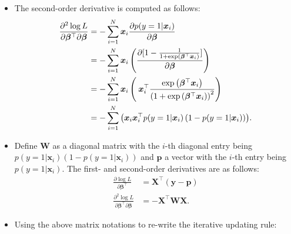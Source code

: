 {\begin{itemize}
                    \begin{equation}
                        \bm{\beta}^t = \bm{\beta}^{t-1} - \eta \left[ \frac{\partial^2 \log L}{\partial \bm{\beta}^\top \partial \bm{\beta}} \right]^{-1} \frac{\partial \log L}{\partial \bm{\beta}^\top}.
                    \end{equation}
                \item The second-order derivative is computed as follows:
                    \begin{equation}
                        \begin{aligned}
                            \frac{\partial^2 \log L}{\partial \bm{\beta}^\top \partial \bm{\beta}} & = -\sum_{i=1}^{N}{\bm{x}_i \frac{\partial p(y=1 | \bm{x}_i)}{\partial \bm{\beta}}   }  \\
                            & = - \sum_{i=1}^{N}{\bm{x}_i \left( \frac{\partial [1 - \frac{1}{1+ \text{exp}\left( \bm{\beta}^\top\bm{x}_i \right) }] }{\partial \bm{\beta}} \right)} \\
                            & = - \sum_{i=1}^{N}{\bm{x}_i \left( \frac{}{} \bm{x}^{\top}_i \frac{ \text{exp}\left( \bm{\beta}^\top \bm{x}_i \right) }{\left( 1 +  \text{exp}\left( \bm{\beta}^\top \bm{x}_i \right) \right)^2} \right)} \\
                            & = -\sum_{i=1}^{N}{\left( \bm{x}_i \bm{x}_i^\top p(y=1 | \bm{x}_i) \left( 1 - p(y=1 | \bm{x}_i)\right) \right)}.
                        \end{aligned}
                    \end{equation}
                \item Define $\bm{W}$ as a diagonal matrix with the $i$-th diagonal entry being $p(y=1| \bm{x}_i)(1 - p(y=1 | \bm{x}_i))$ and $\bm{p}$ a vector with the $i$-th entry being $p(y=1|\bm{x}_i)$.
                The first- and second-order derivatives are as follows:
                    \begin{equation}
                        \begin{aligned}
                            \frac{\partial \log L}{\partial \bm{\beta}^\top} & = \bm{X}^\top (\bm{y} - \bm{p}) \\
                            \frac{\partial^2 \log L}{\partial \bm{\beta}^\top \partial \bm{\beta}} & = -\bm{X}^\top \bm{W} \bm{X}.
                        \end{aligned}
                    \end{equation}  
                \item Using the above matrix notations to re-write the iterative updating rule:

\end{itemize}}
